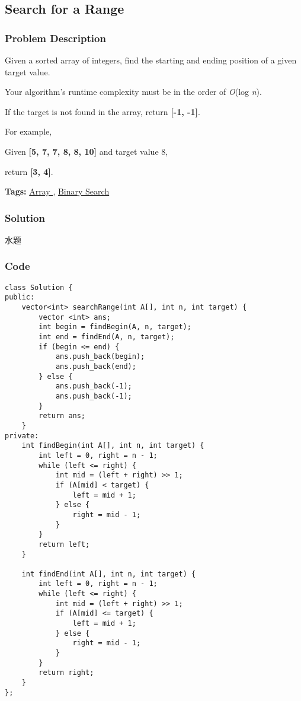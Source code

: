 \documentclass{article}
\begin{document}
\begin{CJK*}{UTF8}{gkai}
\subsection{ Search for a Range }
\label{ Search for a Range }

\subsubsection*{Problem Description}
Given a sorted array of integers, find the starting and ending position of a given target value.

Your algorithm's runtime complexity must be in the order of \emph{O}(log \emph{n}).

If the target is not found in the array, return \textbf{[-1, -1]}.

For example,


Given \textbf{[5, 7, 7, 8, 8, 10]} and target value 8,


return \textbf{[3, 4]}.


\textbf{Tags: }
\hyperref[ Array ]{ Array },  \hyperref[ Binary Search ]{ Binary Search }



\subsubsection*{Solution}
水题

\subsubsection*{Code}
\begin{lstlisting}
class Solution {
public:
    vector<int> searchRange(int A[], int n, int target) {
        vector <int> ans;
        int begin = findBegin(A, n, target);
        int end = findEnd(A, n, target);
        if (begin <= end) {
            ans.push_back(begin);
            ans.push_back(end);
        } else {
            ans.push_back(-1);
            ans.push_back(-1);
        }
        return ans;
    }
private:
    int findBegin(int A[], int n, int target) {
        int left = 0, right = n - 1;
        while (left <= right) {
            int mid = (left + right) >> 1;
            if (A[mid] < target) {
                left = mid + 1;
            } else {
                right = mid - 1;
            }
        }
        return left;
    }
    
    int findEnd(int A[], int n, int target) {
        int left = 0, right = n - 1;
        while (left <= right) {
            int mid = (left + right) >> 1;
            if (A[mid] <= target) {
                left = mid + 1;
            } else {
                right = mid - 1;
            }
        }
        return right;
    }
}; 
\end{lstlisting}



\end{CJK*}
\end{document}
